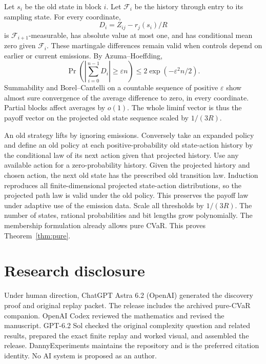 \documentclass[11pt,a4paper]{amsart}
\begin{document}
Let \(s_i\) be the old state in block \(i\). Let \(\mathcal F_i\) be the history through entry to its sampling state. For every coordinate,
\[
 D_i=Z_{ij}-r_j(s_i)/R
\]
is \(\mathcal F_{i+1}\)-measurable, has absolute value at most one, and has conditional mean zero given \(\mathcal F_i\). These martingale differences remain valid when controls depend on earlier or current emissions. By Azuma--Hoeffding,
\[
 \Pr\left(\left|\sum_{i=0}^{n-1}D_i\right|\ge\varepsilon n\right)
 \le 2\exp(-\varepsilon^2 n/2).
\]
Summability and Borel--Cantelli on a countable sequence of positive \(\varepsilon\) show almost sure convergence of the average difference to zero, in every coordinate. Partial blocks affect averages by \(o(1)\). The whole liminf vector is thus the payoff vector on the projected old state sequence scaled by \(1/(3R)\).

An old strategy lifts by ignoring emissions. Conversely take an expanded policy and define an old policy at each positive-probability old state-action history by the conditional law of its next action given that projected history. Use any available action for a zero-probability history. Given the projected history and chosen action, the next old state has the prescribed old transition law. Induction reproduces all finite-dimensional projected state-action distributions, so the projected path law is valid under the old policy. This preserves the payoff law under adaptive use of the emission data. Scale all thresholds by \(1/(3R)\). The number of states, rational probabilities and bit lengths grow polynomially. The membership formulation already allows pure CVaR. This proves Theorem~\ref{thm:pure}.

\section*{Research disclosure}

\begingroup\raggedright
Under human direction, ChatGPT Astra 6.2 (OpenAI) generated the discovery proof and original replay packet. The release includes the archived pure-CVaR companion. OpenAI Codex reviewed the mathematics and revised the manuscript. GPT-6.2 Sol checked the original complexity question and related results, prepared the exact finite replay and worked visual, and assembled the release. DannyExperiments maintains the repository and is the preferred citation identity. No AI system is proposed as an author.
\par\endgroup
\end{document}
